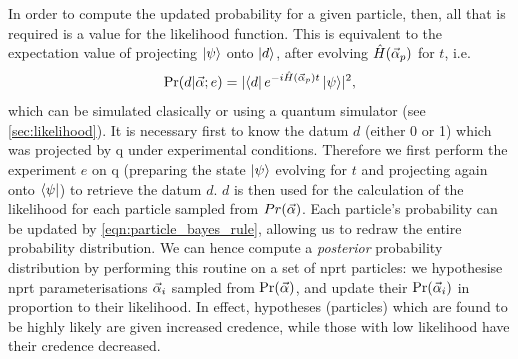 In order to compute the updated probability for a given particle, then, all that is required is a value for the \gls{likelihood} function.
This is equivalent to the expectation value of projecting $\ket{\psi}$ onto $\ket{d}$, after evolving $\hat{H}(\vec{\alpha}_p)$ for $t$, i.e. 
\begin{equation}
    \label{eqn:likelihood}
    \Pr(d | \vec{\alpha}; e) = \lvert \bra{d} e^{-i \hat{H}(\vec{\alpha}_p)t} \ket{\psi} \rvert^2,   
\end{equation}
    which can be simulated clasically or using a quantum simulator (see \cref{sec:likelihood}). 
It is necessary first to know the datum $d$ (either 0 or 1) which was projected by \gls{q} under experimental conditions. 
Therefore we first perform the experiment $e$ on \gls{q} 
    (preparing the state $\ket{\psi}$ evolving for $t$ and projecting again onto $\bra{\psi}$)
    to retrieve the datum $d$. 
$d$ is then used for the calculation of the \gls{likelihood} for each \gls{particle} sampled from $Pr({\vec{\alpha}})$. 
Each particle's probability can be updated by \cref{eqn:particle_bayes_rule}, 
    allowing us to redraw the entire probability distribution.
We can hence compute a \emph{posterior} probability distribution
    by performing this routine on a set of \gls{nprt} \glspl{particle}:
    we hypothesise \gls{nprt} parameterisations $\vec{\alpha}_i$ sampled from $\Pr(\vec{\alpha})$, 
    and update their $\Pr(\vec{\alpha}_i)$ in proportion to their likelihood.
In effect, hypotheses (\glspl{particle}) which are found to be highly likely are given increased credence, 
    while those with low likelihood have their credence decreased. 

